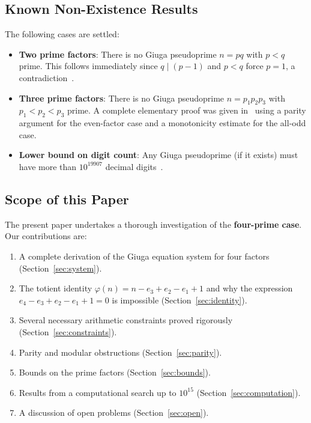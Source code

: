 \documentclass[12pt,a4paper]{amsart}
\theoremstyle{definition}
\begin{document}
\subsection{Known Non-Existence Results}

The following cases are settled:

\begin{itemize}
  \item \textbf{Two prime factors}: There is no Giuga pseudoprime $n = pq$
        with $p < q$ prime.  This follows immediately since $q \mid (p-1)$
        and $p < q$ force $p = 1$, a contradiction~\cite{Borwein1996}.
  \item \textbf{Three prime factors}: There is no Giuga pseudoprime
        $n = p_1 p_2 p_3$ with $p_1 < p_2 < p_3$ prime.  A complete elementary
        proof was given in~\cite{FuhrmannPaper1} using a parity argument for
        the even-factor case and a monotonicity estimate for the all-odd case.
  \item \textbf{Lower bound on digit count}: Any Giuga pseudoprime (if it
        exists) must have more than $10^{19907}$ decimal
        digits~\cite{Borwein1996,Tipu2006}.
\end{itemize}

\subsection{Scope of this Paper}

The present paper undertakes a thorough investigation of the
\textbf{four-prime case}.  Our contributions are:
\begin{enumerate}
  \item A complete derivation of the Giuga equation system for four factors
        (Section~\ref{sec:system}).
  \item The totient identity $\varphi(n) = n - e_3 + e_2 - e_1 + 1$ and
        why the expression $e_4 - e_3 + e_2 - e_1 + 1 = 0$ is impossible
        (Section~\ref{sec:identity}).
  \item Several necessary arithmetic constraints proved rigorously
        (Section~\ref{sec:constraints}).
  \item Parity and modular obstructions (Section~\ref{sec:parity}).
  \item Bounds on the prime factors (Section~\ref{sec:bounds}).
  \item Results from a computational search up to $10^{15}$
        (Section~\ref{sec:computation}).
  \item A discussion of open problems (Section~\ref{sec:open}).
\end{enumerate}
\end{document}
